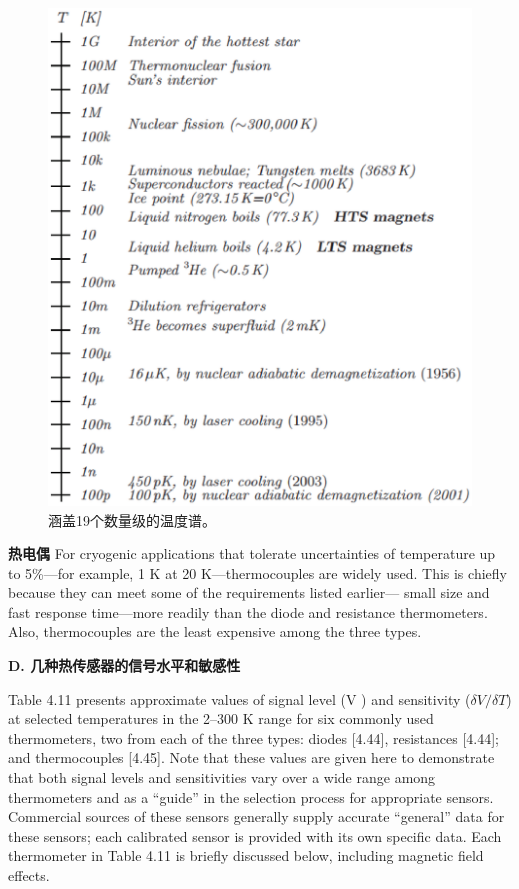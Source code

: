 \begin{figure}[htbp]
	\centering
	\includegraphics[scale=0.6]{chpt4/figs/fig4.19.eps}
	\caption{涵盖19个数量级的温度谱。}
\end{figure}

\textbf{热电偶} For cryogenic applications that tolerate uncertainties of temperature up to 5\%—for example, 1 K at 20 K—thermocouples are widely used.
This is chiefly because they can meet some of the requirements listed earlier—
small size and fast response time—more readily than the diode and resistance
thermometers. Also, thermocouples are the least expensive among the three types.

\textbf{D. 几种热传感器的信号水平和敏感性}

Table 4.11 presents approximate values of signal level (V ) and sensitivity ($\delta V/\delta T$)
at selected temperatures in the 2–300 K range for six commonly used thermometers, two from each of the three types: diodes [4.44], resistances [4.44]; and thermocouples [4.45]. Note that these values are given here to demonstrate that both
signal levels and sensitivities vary over a wide range among thermometers and as
a “guide” in the selection process for appropriate sensors. Commercial sources of
these sensors generally supply accurate “general” data for these sensors; each calibrated sensor is provided with its own specific data. Each thermometer in Table
4.11 is briefly discussed below, including magnetic field effects.

